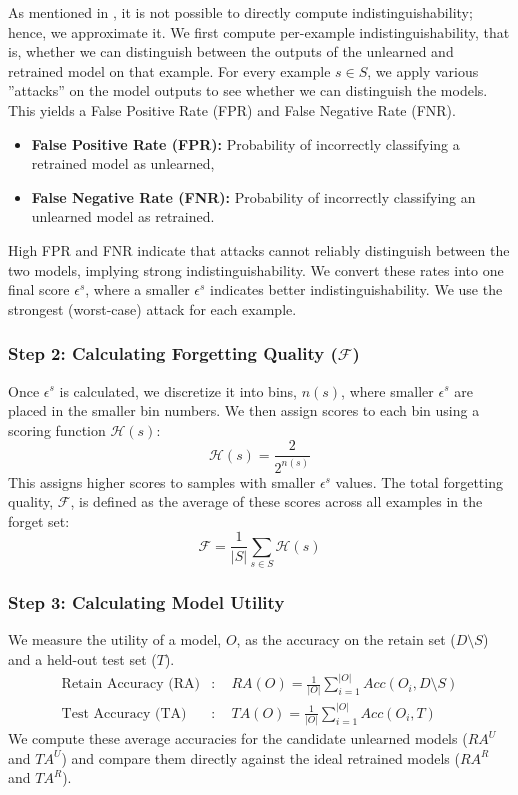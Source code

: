 \documentclass{article}
\begin{document}
As mentioned in , it is not possible to directly compute indistinguishability; hence, we approximate it. We first compute per-example indistinguishability, that is, whether we can distinguish between the outputs of the unlearned and retrained model on that example. For every example $s \in S$, we apply various ''attacks'' on the model outputs to see whether we can distinguish the models. This yields a False Positive Rate (FPR) and False Negative Rate (FNR). 
\begin{itemize}
    \item \textbf{False Positive Rate (FPR):} Probability of incorrectly classifying a retrained model as unlearned,
    \item \textbf{False Negative Rate (FNR):} Probability of incorrectly classifying an unlearned model as retrained.
\end{itemize}
High FPR and FNR indicate that attacks cannot reliably distinguish between the two models, implying strong indistinguishability. We convert these rates into one final score $\epsilon^s$, where a smaller $\epsilon^s$ indicates better indistinguishability. We use the strongest (worst-case) attack for each example.


\subsubsection*{Step 2: Calculating Forgetting Quality ($\mathcal{F}$)}
Once $\epsilon^s$ is calculated, we discretize it into bins, $n(s)$, where smaller $\epsilon^s$ are placed in the smaller bin numbers. We then assign scores to each bin using a scoring function $\mathcal{H}(s)$:
\begin{equation}
    \mathcal{H}(s) = \frac{2}{2^{n(s)}}
\end{equation}
This assigns higher scores to samples with smaller $\epsilon^s$ values. The total forgetting quality, $\mathcal{F}$, is defined as the average of these scores across all examples in the forget set:
\begin{equation}
    \mathcal{F} = \frac{1}{|S|} \sum_{s \in S} \mathcal{H}(s)
\end{equation}

\subsubsection*{Step 3: Calculating Model Utility}
We measure the utility of a model, $O$, as the accuracy on the retain set ($D \setminus S$) and a held-out test set ($T$). 
\begin{align}
    \text{Retain Accuracy (RA)}&: \quad RA(O) = \frac{1}{|O|} \sum_{i=1}^{|O|} Acc(O_i, D \setminus S) \\
    \text{Test Accuracy (TA)}&: \quad TA(O) = \frac{1}{|O|} \sum_{i=1}^{|O|} Acc(O_i, T)
\end{align}
We compute these average accuracies for the candidate unlearned models ($RA^U$ and $TA^U$) and compare them directly against the ideal retrained models ($RA^R$ and $TA^R$).
\end{document}

